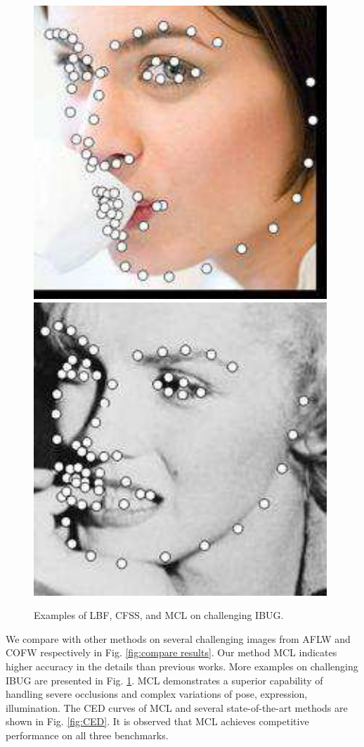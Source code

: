 \documentclass[journal]{IEEEtran}
\begin{document}
\begin{figure}[!htb]
\includegraphics[scale=0.22]{68_LBF_image_097_1}
\includegraphics[scale=0.22]{68_LBF_image_017_1}
\caption{Examples of LBF, CFSS, and MCL on challenging IBUG.}
\label{fig:compare IBUG}
\end{figure}

We compare with other methods on several challenging images from AFLW and COFW respectively in Fig. \ref{fig:compare results}. Our method MCL indicates higher accuracy in the details than previous works. More examples on challenging IBUG are presented in Fig. \ref{fig:compare IBUG}. MCL demonstrates a superior capability of handling severe occlusions and complex variations of pose, expression, illumination. The CED curves of MCL and several state-of-the-art methods are shown in Fig. \ref{fig:CED}. It is observed that MCL achieves competitive performance on all three benchmarks.
\end{document}
